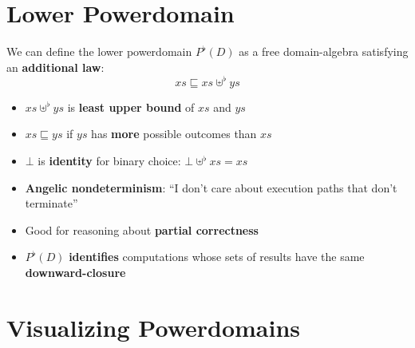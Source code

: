 \documentclass[portrait]{sciposter}
\begin{document}
\begin{multicols}{3}
\section{Lower Powerdomain}

We can define the lower powerdomain $P^\flat(D)$ as a free domain-algebra satisfying an \textbf{additional law}:
$$xs \sqsubseteq xs \uplus^\flat ys$$

\begin{itemize}
\item $xs \uplus^\flat ys$ is \textbf{least upper bound} of $xs$ and $ys$
\item $xs \sqsubseteq ys$ if $ys$ has \textbf{more} possible outcomes than $xs$
\item $\bot$ is \textbf{identity} for binary choice: $\bot\uplus^\flat xs = xs$
\item \textbf{Angelic nondeterminism}: ``I don't care about execution paths that don't terminate''
\item Good for reasoning about \textbf{partial correctness}
\item $P^\flat(D)$ \textbf{identifies} computations whose sets of results have the same \textbf{downward-closure}
\end{itemize}

\columnbreak

\section{Visualizing Powerdomains}


\end{multicols}
\end{document}
